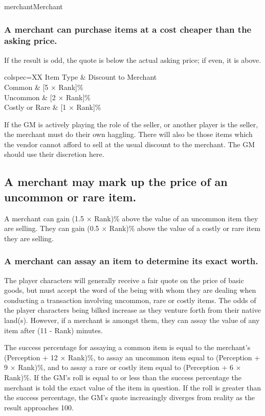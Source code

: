 \begin{Skill}[1.1]{merchant}{Merchant}
\subsubsection{A merchant can purchase items at a cost cheaper than the asking price.}

If the result is odd, the quote is below the actual asking price; if
even, it is above.

\begin{dqtblr}{colspec={XX}}
Item Type	& Discount to Merchant  \\
Common		& [5 × Rank]\% \\
Uncommon	& [2 × Rank]\% \\ 
Costly or Rare	& [1 × Rank]\% \\
\end{dqtblr}

If the GM is actively playing the role of the seller, or another
player is the seller, the merchant must do their own haggling.  There
will also be those items which the vendor cannot afford to sell at the
usual discount to the merchant.  The GM should use their discretion
here.

\subsection{A merchant may mark up the price of an uncommon or rare item.}

A merchant can gain (1.5 × Rank)\% above the value of an uncommon item
they are selling.  They can gain (0.5 × Rank)\% above the value of a
costly or rare item they are selling.

\subsubsection{A merchant can assay an item to determine its exact worth.}

The player characters will generally receive a fair quote on the price
of basic goods, but must accept the word of the being with whom they
are dealing when conducting a transaction involving uncommon, rare or
costly items.  The odds of the player characters being bilked increase
as they venture forth from their native land(s). However, if a
merchant is amongst them, they can assay the value of any item after
(11 - Rank) minutes.

The success percentage for assaying a common item is equal to the
merchant’s (Perception + 12 × Rank)\%, to assay an uncommon item equal
to (Perception + 9 × Rank)\%, and to assay a rare or costly item equal
to (Perception + 6 × Rank)\%.  If the GM’s roll is equal to or less
than the success percentage the merchant is told the exact value of
the item in question.  If the roll is greater than the success
percentage, the GM’s quote increasingly diverges from reality as the
result approaches 100.


\end{Skill}
